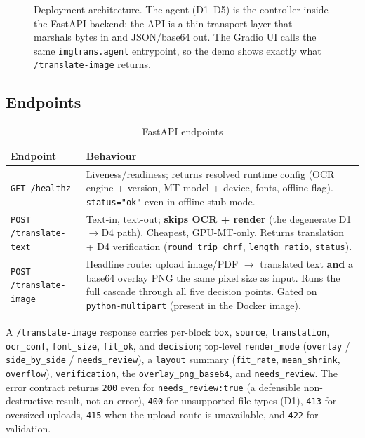 \documentclass[12pt,a4paper]{article}
\begin{document}
\begin{figure}[H]
{\begin{tikzpicture}
\end{tikzpicture}%
}
\caption{Deployment architecture. The agent (D1--D5) is the controller inside the FastAPI backend; the API is a thin transport layer that marshals bytes in and JSON/base64 out. The Gradio UI calls the same \texttt{imgtrans.agent} entrypoint, so the demo shows exactly what \texttt{/translate-image} returns.}
\label{fig:arch}
\end{figure}

\subsection{Endpoints}

\begin{table}[H]
\centering
\caption{FastAPI endpoints}
\small
\begin{tabularx}{\linewidth}{@{} l L @{}}
\toprule
\textbf{Endpoint} & \textbf{Behaviour} \\
\midrule
\texttt{GET /healthz} & Liveness/readiness; returns resolved runtime config (OCR engine + version, MT model + device, fonts, offline flag). \texttt{status="ok"} even in offline stub mode. \\
\texttt{POST /translate-text} & Text-in, text-out; \textbf{skips OCR + render} (the degenerate D1$\rightarrow$D4 path). Cheapest, GPU-MT-only. Returns translation + D4 verification (\texttt{round\_trip\_chrf}, \texttt{length\_ratio}, \texttt{status}). \\
\texttt{POST /translate-image} & Headline route: upload image/PDF $\rightarrow$ translated text \textbf{and} a base64 overlay PNG the same pixel size as input. Runs the full cascade through all five decision points. Gated on \texttt{python-multipart} (present in the Docker image). \\
\bottomrule
\end{tabularx}
\end{table}

A \texttt{/translate-image} response carries per-block \texttt{box}, \texttt{source}, \texttt{translation}, \texttt{ocr\_conf}, \texttt{font\_size}, \texttt{fit\_ok}, and \texttt{decision}; top-level \texttt{render\_mode} (\texttt{overlay} / \texttt{side\_by\_side} / \texttt{needs\_review}), a \texttt{layout} summary (\texttt{fit\_rate}, \texttt{mean\_shrink}, \texttt{overflow}), \texttt{verification}, the \texttt{overlay\_png\_base64}, and \texttt{needs\_review}. The error contract returns \texttt{200} even for \texttt{needs\_review:true} (a defensible non-destructive result, not an error), \texttt{400} for unsupported file types (D1), \texttt{413} for oversized uploads, \texttt{415} when the upload route is unavailable, and \texttt{422} for validation.
\end{document}
